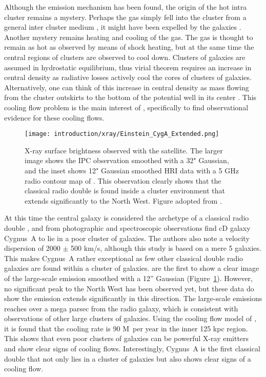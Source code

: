 \documentclass[MScProj_TLRH_ClusterEnergy.tex]{subfiles}
\begin{document}
Although the emission mechanism has been found, the origin of the hot intra cluster
remains a mystery. Perhaps the gas simply fell into the cluster from a general inter
cluster medium \citep{1975PThPh..53..646T}, it might have been expelled by the galaxies
\citep{1973ApJ...185..787Y}. Another mystery remains heating and cooling of the gas.
The gas is thought to remain as hot as observed by means of shock heating, but at the same
time the central regions of clusters are observed to cool down.
Clusters of galaxies are assumed in hydrostatic equilibrium, thus virial theorem
requires an increase in central density as radiative losses actively cool the
cores of clusters of galaxies. Alternatively, one can think of this increase in
central density as mass flowing from the cluster outskirts to the bottom of the
potential well in its center \citep[e.g.][]{1977MNRAS.180..479F}. This cooling
flow problem is the main interest of \citet{1984MNRAS.211..981A}, specifically
to find observational evidence for these cooling flows. 

\begin{figure}
\centering
\texttt{[image: introduction/xray/Einstein\_CygA\_Extended.png]}
\caption{X-ray surface brightness observed with the  satellite.
         The larger image shows the IPC observation smoothed with a 32" Gaussian, 
         and the inset shows 12" Gaussian smoothed HRI data with a 5 GHz radio 
         contour map of \citet{1984MNRAS.209..851A}. This observation clearly shows that 
         the classical radio double is found inside a cluster environment that extends
         significantly to the North West. Figure adopted from \citet{1984MNRAS.211..981A}.}
\label{fig:einstein_extended_radio_double}
\end{figure}

At this time the central galaxy is considered the archetype of a classical radio
double \citep[e.g.][]{1980MNRAS.192..931W}, and from photographic and spectroscopic
observations \citet{1982MNRAS.200..153S} find cD galaxy Cygnus~A to lie in a poor
cluster of galaxies. The authors also note a velocity dispersion of 2000 $\pm$ 500
km/s, although this study is based on a mere 5 galaxies. This makes Cygnus~A rather
exceptional as few other classical double radio galaxies are found within a cluster 
of galaxies. \citet{1984MNRAS.211..981A} are the first to show a clear image of the
large-scale emission smoothed with a 12'' Gaussian (Figure~\ref{fig:einstein_extended_radio_double}).
However, no significant peak to the North West has been observed yet, but these data
do show the emission extends significantly in this direction.
The large-scale emissions reaches over a mega parsec from the radio galaxy,
which is consistent with observations of other large clusters of galaxies.
Using the cooling flow model of \citet{1977MNRAS.180..479F}, it is found that the 
cooling rate is 90 M\Sun \, per year in the inner 125 kpc region. This shows that 
even poor clusters of galaxies can be powerful X-ray emitters and show clear signs
of cooling flows. Interestingly, Cygnus~A is the first classical double that not 
only lies in a cluster of galaxies but also shows clear signs of a cooling flow. \\
\end{document}
